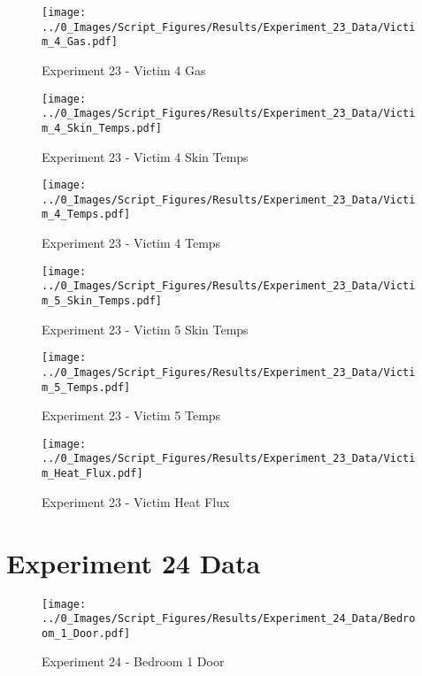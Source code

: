 	\clearpage

	\begin{figure}[H]
		\centering
		\texttt{[image: ../0\_Images/Script\_Figures/Results/Experiment\_23\_Data/Victim\_4\_Gas.pdf]}
		\caption[]{Experiment 23 - Victim 4 Gas}
	\end{figure}
 

	\begin{figure}[H]
		\centering
		\texttt{[image: ../0\_Images/Script\_Figures/Results/Experiment\_23\_Data/Victim\_4\_Skin\_Temps.pdf]}
		\caption[]{Experiment 23 - Victim 4 Skin Temps}
	\end{figure}
 
	\clearpage

	\begin{figure}[H]
		\centering
		\texttt{[image: ../0\_Images/Script\_Figures/Results/Experiment\_23\_Data/Victim\_4\_Temps.pdf]}
		\caption[]{Experiment 23 - Victim 4 Temps}
	\end{figure}
 

	\begin{figure}[H]
		\centering
		\texttt{[image: ../0\_Images/Script\_Figures/Results/Experiment\_23\_Data/Victim\_5\_Skin\_Temps.pdf]}
		\caption[]{Experiment 23 - Victim 5 Skin Temps}
	\end{figure}
 
	\clearpage

	\begin{figure}[H]
		\centering
		\texttt{[image: ../0\_Images/Script\_Figures/Results/Experiment\_23\_Data/Victim\_5\_Temps.pdf]}
		\caption[]{Experiment 23 - Victim 5 Temps}
	\end{figure}
 

	\begin{figure}[H]
		\centering
		\texttt{[image: ../0\_Images/Script\_Figures/Results/Experiment\_23\_Data/Victim\_Heat\_Flux.pdf]}
		\caption[]{Experiment 23 - Victim Heat Flux}
	\end{figure}
 
	\clearpage

\clearpage		\large
\section{Experiment 24 Data} \label{App:Exp24Results} 

	\begin{figure}[H]
		\centering
		\texttt{[image: ../0\_Images/Script\_Figures/Results/Experiment\_24\_Data/Bedroom\_1\_Door.pdf]}
		\caption[]{Experiment 24 - Bedroom 1 Door}
	\end{figure}
 

